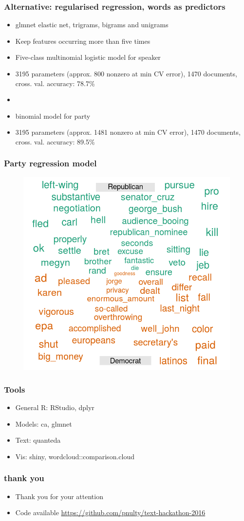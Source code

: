 \documentclass[11pt, table, dvipsnames]{beamer}
\begin{document}
\begin{frame}
  \frametitle{Alternative: regularised regression, words as predictors} 
  \begin{itemize}
  \item glmnet elastic net, trigrams, bigrams and unigrams
  \item Keep features occurring more than five times
  \item Five-class multinomial logistic model for speaker
  \item 3195 parameters (approx. 800 nonzero at min CV error), 1470 documents, cross. val. accuracy: 78.7\%
  \item
  \item binomial model for party
  \item 3195 parameters (approx. 1481 nonzero at min CV error), 1470 documents, cross. val. accuracy: 89.5\% 
  \end{itemize}
\end{frame}

\begin{frame}
  \frametitle{Party regression model}
\begin{figure}
\centering
\includegraphics[width=0.7\linewidth]{../figs/partyCoefs}
\end{figure}
\end{frame}


\begin{frame}
  \frametitle{Tools} 
  \begin{itemize}
  \item General R: RStudio, dplyr
  \item Models: ca, glmnet
  \item Text: quanteda 
  \item Vis: shiny, wordcloud::comparison.cloud
  \end{itemize}
\end{frame}

\begin{frame}
  \frametitle{thank you} 
  \begin{itemize}
  \item Thank you for your attention
  \item Code available \url{https://github.com/pnulty/text-hackathon-2016}
  \end{itemize}
\end{frame}
\end{document}
